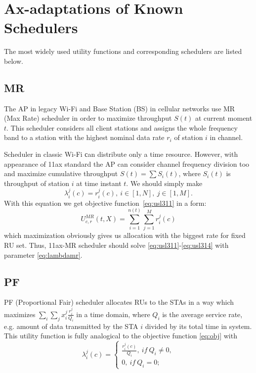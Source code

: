 \section{Ax-adaptations of Known Schedulers}
\label{sec:adaptations}

The most widely used utility functions and corresponding schedulers are listed below. 

\subsection{MR}

The AP in legacy Wi-Fi and Base Station (BS) in cellular networks use MR (Max Rate) scheduler in order to maximize  throughput $S(t)$ at current moment $t$. This scheduler considers all client stations and assigns the whole frequency band to a station with the highest nominal data rate $r_i$ of station $i$ in channel.

Scheduler in classic Wi-Fi сan distribute only a time resource.
However, with appearance of 11ax standard the AP can consider channel frequency division too and maximize cumulative throughput $S(t) = \sum S_i(t)$, where $S_i(t)$ is throughput of station $i$ at time instant $t$. We should simply make   
\begin{equation}
\label{eq:lambdamr}
\lambda_i^j (c) = r_i^j (c),\ i \in [1,N],\ j \in [1, M].
\end{equation}
With this equation we get objective function~\eqref{eq:usl311} in a form:
$$
U^{MR}_{c,r}(t,X) = \sum_{i = 1}^{n(t)} \sum_{j = 1}^{M} r_i^j (c)
$$
which maximization obviously gives us allocation with the biggest rate for fixed RU set. Thus, 11ax-MR scheduler should solve \eqref{eq:usl311}-\eqref{eq:usl314} with parameter \eqref{eq:lambdamr}.

\subsection{PF}

PF (Proportional Fair)  scheduler allocates RUs to the STAs in a way which maximizes $\sum_{i}\sum_{j} x_i^j \frac{r_i^j}{Q_i}$ in a time domain, where $Q_i$ is the average service rate, e.g. amount of data transmitted by the STA $i$ divided by its total time in system. This utility function is fully analogical to the objective function \eqref{eq:obj} with
\begin{equation}
\label{eq:pflambda}
\lambda_i^j (c) = \begin{cases}
\frac{r_i^j(c)}{Q_i},\ if\ Q_i \ne 0,\\
0,\ if\ Q_i  = 0;
\end{cases}
\end{equation}

